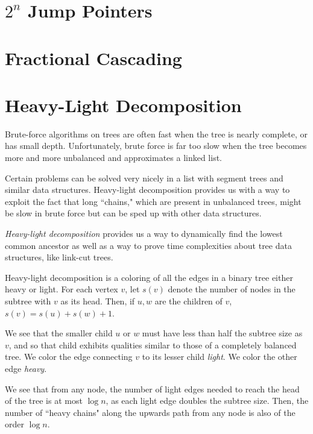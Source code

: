 \documentclass[11pt]{book}
\begin{document}
\section{$2^n$ Jump Pointers}

\section{Fractional Cascading}

\section{Heavy-Light Decomposition}

Brute-force algorithms on trees are often fast when the tree is nearly complete, or has small depth. Unfortunately, brute force is far too slow when the tree becomes more and more unbalanced and approximates a linked list.

Certain problems can be solved very nicely in a list with segment trees and similar data structures. Heavy-light decomposition provides us with a way to exploit the fact that long ``chains," which are present in unbalanced trees, might be slow in brute force but can be sped up with other data structures.

\textit{Heavy-light decomposition} provides us a way to dynamically find the lowest common ancestor as well as a way to prove time complexities about tree data structures, like link-cut trees. 

Heavy-light decomposition is a coloring of all the edges in a binary tree either heavy or light. For each vertex $v$, let $s(v)$ denote the number of nodes in the subtree with $v$ as its head. Then, if $u,w$ are the children of $v$, $s(v)=s(u)+s(w)+1$.

We see that the smaller child $u$ or $w$ must have less than half the subtree size as $v$, and so that child exhibits qualities similar to those of a completely balanced tree. We color the edge connecting $v$ to its lesser child \textit{light}. We color the other edge \textit{heavy}.

We see that from any node, the number of light edges needed to reach the head of the tree is at most $\log{n}$, as each light edge doubles the subtree size. Then, the number of ``heavy chains" along the upwards path from any node is also of the order $\log{n}$.
\end{document}
